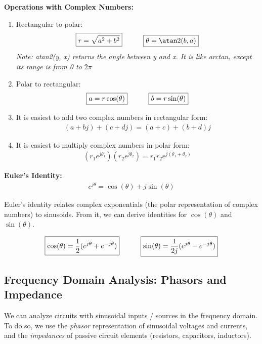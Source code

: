 \textbf{Operations with Complex Numbers:}
\begin{enumerate}
    \item Rectangular to polar:
    \begin{align*}
        \boxed{r = \sqrt{a^2 + b^2}} \hspace{30px} \boxed{\theta = \atan2(b, a)}
    \end{align*}
    \textit{Note: atan2(y, x) returns the angle between y and x. It is like arctan, except its range is from 0 to $2\pi$}
    \item Polar to rectangular:
    \begin{align*}
        \boxed{a = r \cos(\theta)} \hspace{30px} \boxed{b = r \sin(\theta)}
    \end{align*}

    \item It is easiest to add two complex numbers in rectangular form:
    \begin{align*}
        (a + bj) + (c + dj) = (a + c) + (b + d)j
    \end{align*}

    \item It is easiest to multiply complex numbers in polar form:
    \begin{align*}
        (r_1 e^{j \theta_1})(r_2 e^{j \theta_2}) = r_1 r_2 e^{j (\theta_1 + \theta_2)}
    \end{align*}
\end{enumerate}

\textbf{Euler's Identity:}
\begin{align*}
    \boxed{e^{j \theta} = \cos(\theta) + j \sin(\theta)}
\end{align*}

Euler's identity relates complex exponentials (the polar representation of complex numbers) to sinusoids. From it, we can derive identities for $\cos(\theta)$ and $\sin(\theta)$.

\begin{align*}
    \boxed{\cos(\theta) = \frac{1}{2} (e^{j \theta} + e^{-j \theta})} \hspace{30px}
    \boxed{\sin(\theta) = \frac{1}{2j} (e^{j \theta} - e^{-j \theta})}
\end{align*}

\subsection*{Frequency Domain Analysis: Phasors and Impedance}
We can analyze circuits with sinusoidal inputs / sources in the frequency domain. To do so, we use the \textit{phasor} representation of sinusoidal voltages and currents, and the \textit{impedances} of passive circuit elements (resistors, capacitors, inductors).

